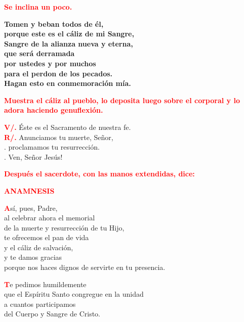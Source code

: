 \documentclass[12pt, letterpaper]{report}
\begin{document}
  \large{\bfseries \textcolor{red}{Se inclina un poco.}}

  \LARGE{ \bfseries{ Tomen y beban todos de \'el,\\
  porque este es el c\'aliz de mi Sangre,\\
  Sangre de la alianza nueva y eterna,\\
  que ser\'a derramada\\
  por ustedes y por muchos\\
  para el perdon de los pecados.\\
  Hagan esto en conmemoraci\'on m\'ia.}}

  \large{\bfseries \textcolor{red}{Muestra el c\'aliz al pueblo, lo deposita luego sobre el corporal y lo adora haciendo genuflexi\'on.}} 

  \Large \hspace{-0.9cm} {\bfseries \textcolor{red}{V/.}} \hspace{0.6cm} \'Este es el Sacramento de nuestra fe.\\
  \Large \hspace{-0.9cm} {\bfseries \textcolor{red}{R/.}} \hspace{0.4cm} Anunciamos tu muerte, Se\~nor,\\
  . \hspace{1.3cm} proclamamos tu resurrecci\'on.\\
  . \hspace{1.3cm} Ven, Se\~nor Jes\'us!

  \large{\bfseries \textcolor{red}{Despu\'es el sacerdote, con las manos extendidas, dice:}}
  
  \Large {\bfseries \textcolor{red}{ANAMNESIS}}

  \lettrine[lines=2]{\bfseries \textcolor{red}{A}}{}\Large s\'i, pues, Padre,\\
  al celebrar ahora el memorial\\
  de la muerte y resurrecci\'on de tu Hijo,\\
  te ofrecemos el pan de vida \\
  y el c\'aliz de salvaci\'on,\\
  y te damos gracias\\
  porque nos haces dignos de servirte en tu presencia.

  \lettrine[lines=2]{\bfseries \textcolor{red}{T}}{}\Large e pedimos humildemente\\
  que el Esp\'iritu Santo congregue en la unidad\\
  a cuantos participamos\\
  del Cuerpo y Sangre de Cristo.
\end{document}
